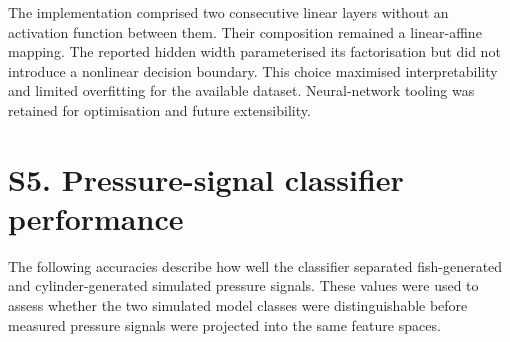 \documentclass[11pt,a4paper]{article}
\begin{document}
The implementation comprised two consecutive linear layers without an activation function between them. Their composition remained a linear-affine mapping. The reported hidden width parameterised its factorisation but did not introduce a nonlinear decision boundary. This choice maximised interpretability and limited overfitting for the available dataset. Neural-network tooling was retained for optimisation and future extensibility.

\begin{table}[htbp]
\centering
\caption*{Table S3. Hyperparameters selected independently for each model and retained-variance level.}
\end{table}

\section*{S5. Pressure-signal classifier performance}

The following accuracies describe how well the classifier separated fish-generated and cylinder-generated simulated pressure signals. These values were used to assess whether the two simulated model classes were distinguishable before measured pressure signals were projected into the same feature spaces.
\end{document}
